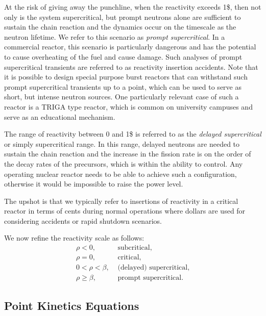 At the risk of giving away the punchline, when the reactivity exceeds 1\$, then not only is the system supercritical, but prompt neutrons alone are sufficient to sustain the chain reaction and the dynamics occur on the timescale as the neutron lifetime. We refer to this scenario as \emph{prompt supercritical}. In a commercial reactor, this scenario is particularly dangerous and has the potential to cause overheating of the fuel and cause damage. Such analyses of prompt supercritical transients are referred to as reactivity insertion accidents. Note that it is possible to design special purpose burst reactors that can withstand such prompt supercritical transients up to a point, which can be used to serve as short, but intense neutron sources. One particularly relevant case of such a reactor is a TRIGA type reactor, which is common on university campuses and serve as an educational mechanism.

The range of reactivity between 0 and 1\$ is referred to as the \emph{delayed supercritical} or simply supercritical range. In this range, delayed neutrons are needed to sustain the chain reaction and the increase in the fission rate is on the order of the decay rates of the precursors, which is within the ability to control. Any operating nuclear reactor needs to be able to achieve such a configuration, otherwise it would be impossible to raise the power level.

The upshot is that we typically refer to insertions of reactivity in a critical reactor in terms of cents during normal operations where dollars are used for considering accidents or rapid shutdown scenarios.

We now refine the reactivity scale as follows:
\begin{align}
  \rho < 0, &\text{ subcritical,} \nonumber \\
  \rho = 0, &\text{ critical,} \nonumber \\
  0 < \rho < \beta, &\text{ (delayed) supercritical,} \nonumber \\
  \rho \ge \beta, &\text{ prompt supercritical.} \nonumber
\end{align}

\subsection{Point Kinetics Equations}

